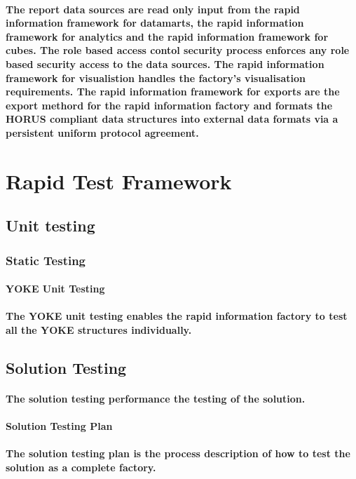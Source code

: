 \documentclass{acm_proc_article-sp}
\begin{document}
\paragraph{The report data sources are read only input from the rapid information framework for datamarts, the rapid information framework for analytics and the rapid information framework for cubes. The role based access contol security process enforces any role based security access to the data sources. The rapid information framework for visualistion handles the factory's visualisation requirements. The rapid information framework for exports are the export methord for the rapid information factory and formats the HORUS compliant data structures into external data formats via a persistent uniform protocol agreement. }

\newpage
\section{Rapid Test Framework}
\subsection{Unit testing}
\subsubsection{Static Testing}
\paragraph{YOKE Unit Testing}
\paragraph{The YOKE unit testing enables the rapid information factory to test all the YOKE structures individually.}
\subsection{Solution Testing}
\paragraph{The solution testing performance the testing of the solution.}
\paragraph{Solution Testing Plan}
\paragraph{The solution testing plan is the process description of how to test the solution as a complete factory.}
\end{document}
